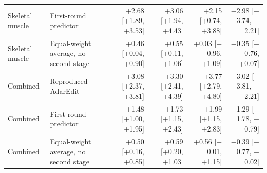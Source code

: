\begin{table}[H]
{\begin{tabular}{llrrrr}
Skeletal muscle & First-round predictor & +2.68 [+1.89, +3.53] & +3.06 [+1.94, +4.43] & +2.15 [+0.74, +3.88] & $-$2.98 [$-$3.74, $-$2.21] \\
Skeletal muscle & Equal-weight average, no second stage & +0.46 [+0.04, +0.90] & +0.55 [+0.11, +1.06] & +0.03 [$-$0.96, +1.09] & $-$0.35 [$-$0.76, +0.07] \\
Combined & Reproduced AdarEdit & +3.08 [+2.37, +3.81] & +3.30 [+2.41, +4.39] & +3.77 [+2.79, +4.80] & $-$3.02 [$-$3.81, $-$2.21] \\
Combined & First-round predictor & +1.48 [+1.00, +1.95] & +1.73 [+1.15, +2.43] & +1.99 [+1.15, +2.83] & $-$1.29 [$-$1.78, $-$0.79] \\
Combined & Equal-weight average, no second stage & +0.50 [+0.16, +0.85] & +0.59 [+0.20, +1.03] & +0.56 [$-$0.01, +1.15] & $-$0.39 [$-$0.77, $-$0.02] \\
\bottomrule
\end{tabular}}
\end{table}

